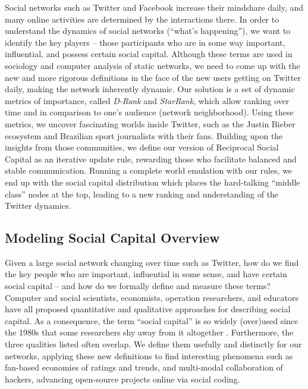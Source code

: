 \documentclass[10pt,oneside]{memoir}
\begin{document}
Social networks such as Twitter and Facebook increase their mindshare daily, and many online activities are determined by the interactions there. In order to understand the dynamics of social networks (``what's happening''), we want to identify the key players -- those participants who are in some way important, influential, and possess certain social capital. Although these terms are used in sociology and computer analysis of static networks, we need to come up with the new and more rigorous definitions in the face of the new users getting on Twitter daily, making the network inherently dynamic. Our solution is a set of dynamic metrics of importance, called {\itshape D-Rank} and {\itshape StarRank}, which allow ranking over time and in comparison to one's audience (network neighborhood). Using these metrics, we uncover fascinating worlds inside Twitter, such as the Justin Bieber ecosystem and Brazilian sport journalists with their fans. Building upon the insights from those communities, we define our version of Reciprocal Social Capital as an iterative update rule, rewarding those who facilitate balanced and stable communication. Running a complete world emulation with our rules, we end up with the social capital distribution which places the hard-talking ``middle class'' nodes at the top, leading to a new ranking and understanding of the Twitter dynamics.


\pagebreak \subsection{Modeling Social Capital Overview}
\label{modelingsocialcapitaloverview}

Given a large social network changing over time such as Twitter, how do we find the key people who are important, influential in some sense, and have certain social capital -- and how do we formally define and measure these terms? Computer and social scientists, economists, operation researchers, and educators have all proposed quantitative and qualitative approaches for describing social capital. As a consequence, the term ``social capital'' is so widely (over)used since the 1980s that some researchers shy away from it altogether \cite{jackson2008social}. Furthermore, the three qualities listed often overlap. We define them usefully and distinctly for our networks, applying these new definitions to find interesting phenomena such as fan-based economies of ratings and trends, and multi-modal collaboration of hackers, advancing open-source projects online via social coding.
\end{document}
